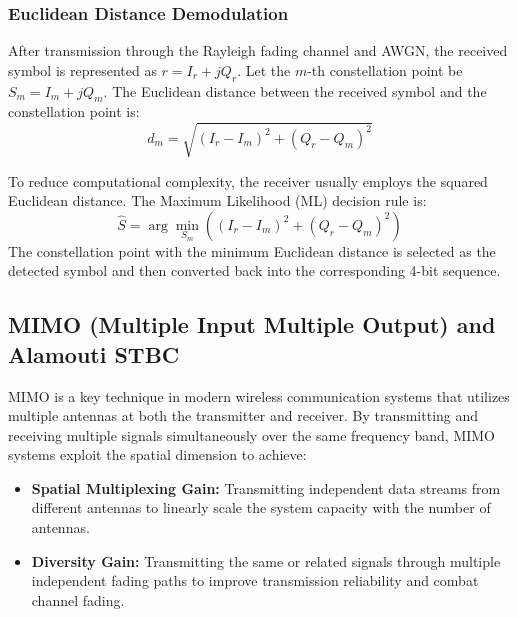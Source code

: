 \documentclass[a4paper]{article}
\begin{document}
\subsubsection{Euclidean Distance Demodulation}
After transmission through the Rayleigh fading channel and AWGN, the received symbol is represented as $r = I_r + jQ_r$. Let the $m$-th constellation point be $S_m = I_m + jQ_m$. The Euclidean distance between the received symbol and the constellation point is:
\begin{equation}
d_m = \sqrt{(I_r - I_m)^2 + (Q_r - Q_m)^2}
\end{equation}

To reduce computational complexity, the receiver usually employs the squared Euclidean distance. The Maximum Likelihood (ML) decision rule is:
\begin{equation}
\hat{S} = \arg \min_{S_m} \left( (I_r - I_m)^2 + (Q_r - Q_m)^2 \right)
\end{equation}
The constellation point with the minimum Euclidean distance is selected as the detected symbol and then converted back into the corresponding 4-bit sequence.

\subsection{MIMO (Multiple Input Multiple Output) and Alamouti STBC}
MIMO is a key technique in modern wireless communication systems that utilizes multiple antennas at both the transmitter and receiver. By transmitting and receiving multiple signals simultaneously over the same frequency band, MIMO systems exploit the spatial dimension to achieve:
\begin{itemize}
    \item \textbf{Spatial Multiplexing Gain:} Transmitting independent data streams from different antennas to linearly scale the system capacity with the number of antennas.
    \item \textbf{Diversity Gain:} Transmitting the same or related signals through multiple independent fading paths to improve transmission reliability and combat channel fading.
\end{itemize}
\end{document}
